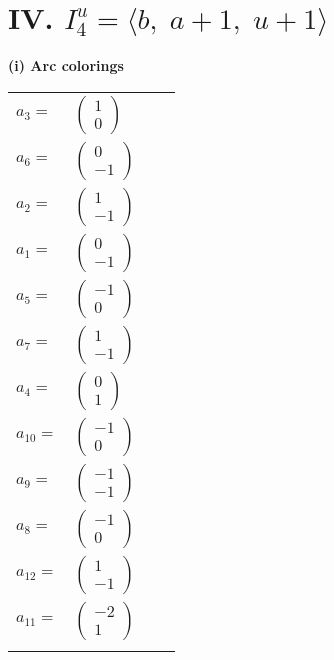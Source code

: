 \documentclass[1p]{elsarticle_modified}
\theoremstyle{definition}
\begin{document}
\centering \section*{IV. $I^u_{4}= \langle b,\;a+1,\;u+1 \rangle$}
\flushleft \textbf{(i) Arc colorings}\\
\begin{tabular}{m{7pt} m{180pt} m{7pt} m{180pt} }
\flushright $a_{3}=$&$\begin{pmatrix}1\\0\end{pmatrix}$ \\
\flushright $a_{6}=$&$\begin{pmatrix}0\\-1\end{pmatrix}$ \\
\flushright $a_{2}=$&$\begin{pmatrix}1\\-1\end{pmatrix}$ \\
\flushright $a_{1}=$&$\begin{pmatrix}0\\-1\end{pmatrix}$ \\
\flushright $a_{5}=$&$\begin{pmatrix}-1\\0\end{pmatrix}$ \\
\flushright $a_{7}=$&$\begin{pmatrix}1\\-1\end{pmatrix}$ \\
\flushright $a_{4}=$&$\begin{pmatrix}0\\1\end{pmatrix}$ \\
\flushright $a_{10}=$&$\begin{pmatrix}-1\\0\end{pmatrix}$ \\
\flushright $a_{9}=$&$\begin{pmatrix}-1\\-1\end{pmatrix}$ \\
\flushright $a_{8}=$&$\begin{pmatrix}-1\\0\end{pmatrix}$ \\
\flushright $a_{12}=$&$\begin{pmatrix}1\\-1\end{pmatrix}$ \\
\flushright $a_{11}=$&$\begin{pmatrix}-2\\1\end{pmatrix}$\\&\end{tabular}
\end{document}
